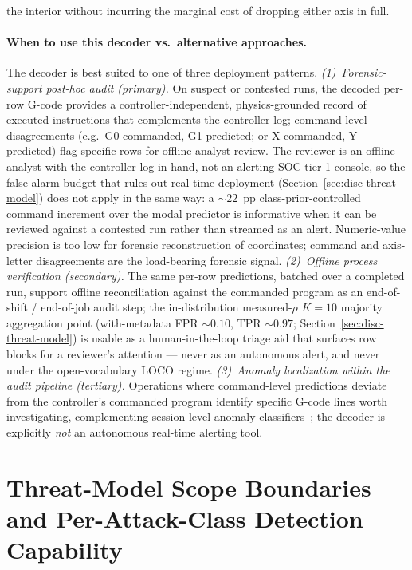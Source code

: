 \documentclass[11pt,a4paper]{article}
\begin{document}
the interior without incurring the marginal cost of dropping either axis in full.

\paragraph{When to use this decoder vs.\ alternative approaches.} The decoder is best suited to one of three deployment patterns. \emph{(1)~Forensic-support post-hoc audit (primary).} On suspect or contested runs, the decoded per-row G-code provides a controller-independent, physics-grounded record of executed instructions that complements the controller log; command-level disagreements (e.g.\ G0 commanded, G1 predicted; or X commanded, Y predicted) flag specific rows for offline analyst review. The reviewer is an offline analyst with the controller log in hand, not an alerting SOC tier-1 console, so the false-alarm budget that rules out real-time deployment (Section~\ref{sec:disc-threat-model}) does not apply in the same way: a $\sim$$22$~pp class-prior-controlled command increment over the modal predictor is informative when it can be reviewed against a contested run rather than streamed as an alert. Numeric-value precision is too low for forensic reconstruction of coordinates; command and axis-letter disagreements are the load-bearing forensic signal. \emph{(2)~Offline process verification (secondary).} The same per-row predictions, batched over a completed run, support offline reconciliation against the commanded program as an end-of-shift / end-of-job audit step; the in-distribution measured-$\rho$ $K\!=\!10$ majority aggregation point (with-metadata FPR $\sim 0.10$, TPR $\sim 0.97$; Section~\ref{sec:disc-threat-model}) is usable as a human-in-the-loop triage aid that surfaces row blocks for a reviewer's attention --- never as an autonomous alert, and never under the open-vocabulary LOCO regime. \emph{(3)~Anomaly localization within the audit pipeline (tertiary).} Operations where command-level predictions deviate from the controller's commanded program identify specific G-code lines worth investigating, complementing session-level anomaly classifiers~\cite{coelho2024anomaly,kimmell2025cnc}; the decoder is explicitly \emph{not} an autonomous real-time alerting tool.

\section{Threat-Model Scope Boundaries and Per-Attack-Class Detection Capability}
\label{app:threat-scope}
\end{document}
